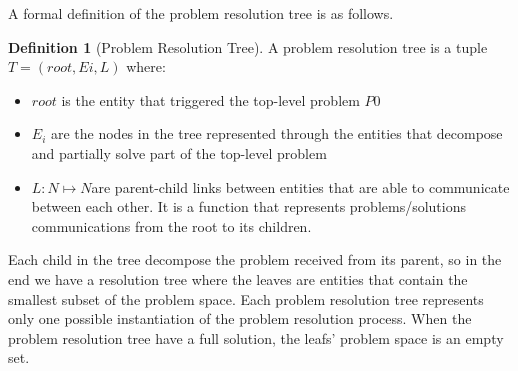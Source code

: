 \documentclass[journal]{IEEEtran}
\theoremstyle{definition}
\newtheorem{definition}{Definition}
\begin{document}
A formal definition of the problem resolution tree is as follows. 

\begin{definition}[Problem Resolution Tree]
A problem resolution tree is a tuple $T = (root, Ei, L) $ where:
\begin{itemize}
\item $root$ is the entity that triggered the top-level problem $P0$
\item $E_i$ are the nodes in the tree represented through the entities that decompose and partially solve part of the top-level problem
\item $L: N \mapsto N $are parent-child links between
entities that are able to communicate between each other. It is a function that represents problems/solutions communications from the root to its children.
\end{itemize}
\end{definition}

Each child in the tree decompose the problem received from its parent, so in the end we have a resolution tree where the leaves are entities that contain the smallest subset of the problem space. Each problem resolution tree represents only one possible instantiation of the problem resolution process. When the problem resolution tree have a full solution, the leafs' problem space  is an empty set.




\end{document}
